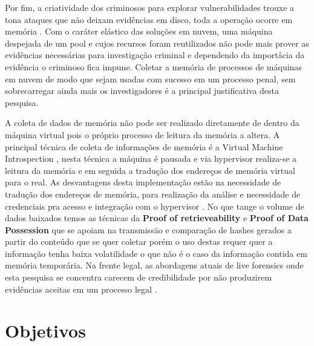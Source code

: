 \documentclass[
	12pt,				%
	openright,			%
	oneside,			%
	a4paper,			%
	english,			%
	french,				%
	spanish,			%
	brazil,				%
	]{abntex2}
\begin{document}
\par

Por fim, a criatividade dos criminosos para explorar vulnerabilidades trouxe a tona ataques que não deixam evidências em disco, toda a operação ocorre em memória \cite{Rahman2015}. Com o 
caráter elástico das soluções em nuvem, uma máquina despejada de um pool e cujos recursos foram reutilizados não pode mais prover as evidências necessárias para investigação criminal e 
dependendo da importâcia da evidência o criminoso fica impune. Coletar a memória de processos de máquinas em nuvem de modo que sejam usadas com sucesso em um processo penal, sem 
sobrecarregar ainda mais os investigadores é a principal justificativa desta pesquisa.

\par

A coleta de dados de memória não pode ser realizado diretamente de dentro da máquina virtual pois o próprio processo de leitura da memória a altera. A principal técnica de coleta
de informações de memória é a Virtual Machine Introspection , nesta técnica a máquina é pausada e via hypervisor realiza-se a leitura da memória e em seguida a tradução dos 
endereços de memória virtual para o real. As desvantagens desta implementação estão na necessidade de tradução dos endereços de memória, para realização da análise e necessidade de 
credenciais pra acesso e integração com o hypervisor \cite{Dolan-Gavitt2011a}. No que tange o volume de dados baixados temos as técnicas da \textbf{Proof of retrieveability} 
e \textbf{Proof of Data Possession} que se apoiam na transmissão e comparação de hashes gerados a partir do conteúdo que se quer coletar \cite{Birk2011} porém o uso destas requer
quer a informação tenha baixa volatilidade o que não é o caso da informação contida em memória temporária. Na frente legal, as abordagens atuais de live forensics onde esta 
pesquisa se concentra carecem de credibilidade por não produzirem evidências aceitas em um processo legal \cite{Rahman2015}.

\chapter{Objetivos}
\end{document}
